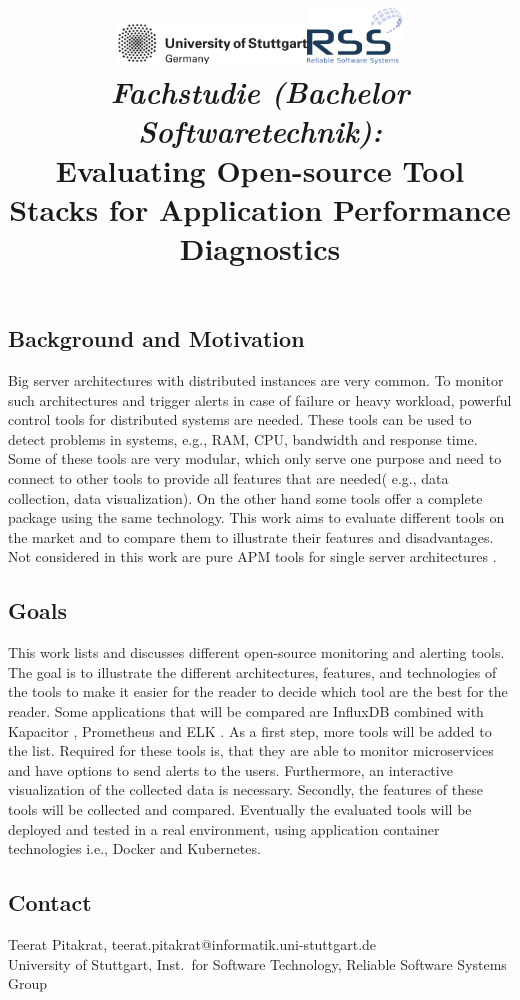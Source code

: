 \documentclass[a4paper,12pt]{article}
\date{}
\title{
\includegraphics[width=5cm]{figures/stuttgart-vector.pdf}\hfill{\includegraphics[width=2.5cm]{figures/rss_logo.pdf}}
\quad \\ [0.5cm]
{\large \textit{Fachstudie (Bachelor Softwaretechnik):}} \\ [1mm]
{\Large Evaluating Open-source Tool Stacks for Application Performance Diagnostics}
}
\begin{document}
	

\maketitle

\thispagestyle{empty}

\vspace{-2.5cm}


\subsection*{Background and Motivation}
Big server architectures with distributed instances are very common. To monitor such architectures and trigger alerts in case of failure or heavy workload, powerful control tools for distributed systems are needed. These tools can be used to detect problems in systems, e.g., RAM, CPU, bandwidth and response time. Some of these tools are very modular, which only serve one purpose and need to connect to other tools to provide all features that are needed( e.g., data collection, data visualization). On the other hand some tools offer a complete package using the same technology.
This work aims to evaluate different tools on the market and to compare them to illustrate their features and disadvantages. 
Not considered in this work are pure APM tools for single server architectures \cite{ahmed2016studying,Heger2017} .

\subsection*{Goals}
This work lists and discusses different open-source monitoring and alerting tools. The goal is to illustrate the different architectures, features, and technologies of the tools to make it easier for the reader to decide which tool are the best for the reader.
Some applications that will be compared are InfluxDB combined with Kapacitor \cite{InfluxDB}, Prometheus \cite{Prometheus}  and ELK \cite{ELK} . As a first step, more tools will be added to the list. Required for these tools is, that they are able to monitor microservices and have options to send alerts to the users. Furthermore, an interactive visualization of the collected data is necessary.
Secondly, the features of these tools will be collected and compared. Eventually the evaluated tools will be deployed and tested in a real environment, using application container technologies i.e., Docker and Kubernetes. 


\begin{scriptsize}


\end{scriptsize}

\subsection*{Contact}
Teerat Pitakrat, teerat.pitakrat@informatik.uni-stuttgart.de \\
University of Stuttgart, Inst.\ for Software Technology, Reliable Software Systems Group \\
\end{document}
